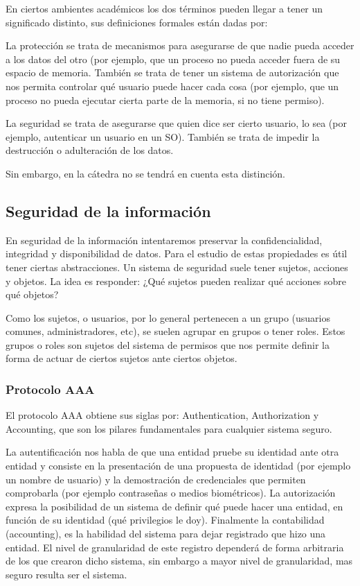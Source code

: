 \documentclass{article}
\begin{document}
En ciertos ambientes académicos los dos términos pueden llegar a tener un significado distinto, sus definiciones formales están dadas por:

La protección se trata de mecanismos para asegurarse de que nadie pueda acceder a los datos del otro (por ejemplo, que un proceso no pueda acceder fuera de su espacio de memoria. También se trata de tener un sistema de autorización que nos permita controlar qué usuario puede hacer cada cosa (por ejemplo, que un proceso no pueda ejecutar cierta parte de la memoria, si no tiene permiso).

La seguridad se trata de asegurarse que quien dice ser cierto usuario, lo sea (por ejemplo, autenticar un usuario en un SO). También se trata de impedir la destrucción o adulteración de los datos.

Sin embargo, en la cátedra no se tendrá en cuenta esta distinción.

\subsection{Seguridad de la información}

En seguridad de la información intentaremos preservar la confidencialidad, integridad y disponibilidad de datos. Para el estudio de estas propiedades es útil tener ciertas abstracciones. Un sistema de seguridad suele tener sujetos, acciones y objetos. La idea es responder: ¿Qué sujetos pueden realizar qué acciones sobre qué objetos?

Como los sujetos, o usuarios, por lo general pertenecen a un grupo (usuarios comunes, administradores, etc), se suelen agrupar en grupos o tener roles. Estos grupos o roles son sujetos del sistema de permisos que nos permite definir la forma de actuar de ciertos sujetos ante ciertos objetos.

\subsubsection{Protocolo AAA}

El protocolo AAA obtiene sus siglas por: Authentication, Authorization y Accounting, que son los pilares fundamentales para cualquier sistema seguro. 

La autentificación nos habla de que una entidad pruebe su identidad ante otra entidad y consiste en la presentación de una propuesta de identidad (por ejemplo un nombre de usuario) y la demostración de credenciales que permiten comprobarla (por ejemplo contraseñas o medios biométricos). La autorización expresa la posibilidad de un sistema de definir qué puede hacer una entidad, en función de su identidad (qué privilegios le doy). Finalmente la contabilidad (accounting), es la habilidad del sistema para dejar registrado que hizo una entidad. El nivel de granularidad de este registro dependerá de forma arbitraria de los que crearon dicho sistema, sin embargo a mayor nivel de granularidad, mas seguro resulta ser el sistema.
\end{document}
